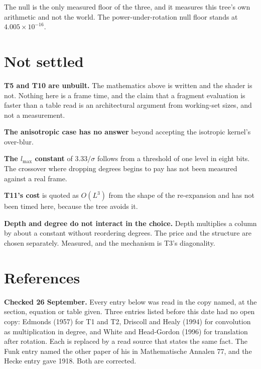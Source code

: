 The null is the only measured floor of the three, and it measures this tree's own arithmetic and not the world. The power-under-rotation null floor stands at \(4.005 \times 10^{-16}\).

\section{Not settled}

\textbf{T5 and T10 are unbuilt.} The mathematics above is written and the shader is not. Nothing here is a frame time, and the claim that a fragment evaluation is faster than a table read is an architectural argument from working-set sizes, and not a measurement.

\textbf{The anisotropic case has no answer} beyond accepting the isotropic kernel's over-blur.

\textbf{The \(l_{\max}\) constant} of \(3.33/\sigma\) follows from a threshold of one level in eight bits. The crossover where dropping degrees begins to pay has not been measured against a real frame.

\textbf{T11's cost} is quoted as \(O(L^3)\) from the shape of the re-expansion and has not been timed here, because the tree avoids it.

\textbf{Depth and degree do not interact in the choice.} Depth multiplies a column by about a constant without reordering degrees. The price and the structure are chosen separately. Measured, and the mechanism is T3's diagonality.

\section{References}

\textbf{Checked 26 September.} Every entry below was read in the copy named, at the section, equation or table given. Three entries listed before this date had no open copy: Edmonds (1957) for T1 and T2, Driscoll and Healy (1994) for convolution as multiplication in degree, and White and Head-Gordon (1996) for translation after rotation. Each is replaced by a read source that states the same fact. The Funk entry named the other paper of his in Mathematische Annalen 77, and the Hecke entry gave 1918. Both are corrected.

